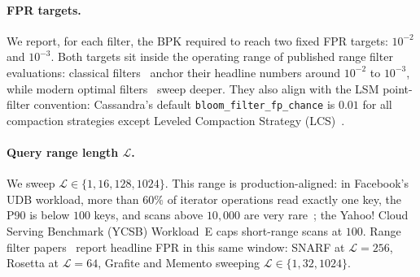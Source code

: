 \paragraph{FPR targets.}\label{par:fpr-targets}
We report, for each filter, the BPK required to reach two fixed FPR
targets: $10^{-2}$ and $10^{-3}$. Both targets sit inside the operating
range of published range filter evaluations: classical
filters~\citep{zhang2018surf,luo2020rosetta,wang2024grf} anchor their
headline numbers around $10^{-2}$ to $10^{-3}$, while modern optimal
filters~\citep{vaidya2022snarf,grafite2024,eslami2024memento} sweep
deeper. They also align with the LSM point-filter convention:
Cassandra's default \texttt{bloom\_filter\_fp\_chance} is $0.01$ for
all compaction strategies except Leveled Compaction Strategy (LCS)~\citep{cassandra-bloom}.

\paragraph{Query range length $\mathcal{L}$.}
We sweep $\mathcal{L} \in \{1, 16, 128, 1024\}$. This range is
production-aligned: in Facebook's UDB workload, more than $60\%$ of
iterator operations read exactly one key, the P90 is below $100$ keys,
and scans above $10{,}000$ are very rare~\citep{cao2020facebook}; the
Yahoo! Cloud Serving Benchmark (YCSB) Workload~E caps short-range scans
at $100$. Range filter
papers~\citep{vaidya2022snarf,luo2020rosetta,grafite2024,eslami2024memento}
report headline FPR in this same window: SNARF at $\mathcal{L} = 256$,
Rosetta at $\mathcal{L} = 64$, Grafite and Memento sweeping
$\mathcal{L} \in \{1, 32, 1024\}$.